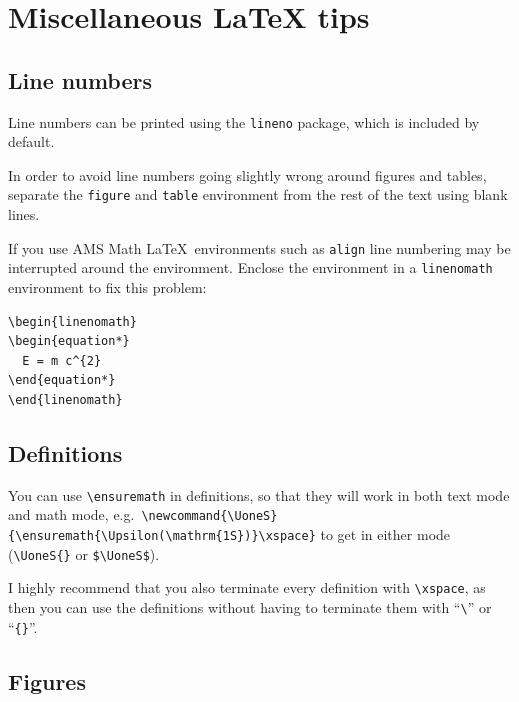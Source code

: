 \documentclass[UKenglish]{latex/atlasdoc}
\newcommand{\Macro}[1]{\texttt{\textbackslash #1}\xspace}
\newcommand{\Package}[1]{\texttt{#1}\xspace}
\begin{document}
\section{Miscellaneous \LaTeX{} tips}
\label{sec:latex}

\subsection{Line numbers}

Line numbers can be printed using the \Package{lineno} package, 
which is included by default.

In order to avoid line numbers going slightly wrong around figures and tables,
separate the \Package{figure} and \Package{table} environment from the rest of the text using blank lines.

If you use AMS Math \LaTeX\ environments such as \Package{align} line numbering may be interrupted around the environment.
Enclose the environment in a \Package{linenomath} environment to fix this problem:
\begin{verbatim}
\begin{linenomath}
\begin{equation*}
  E = m c^{2}
\end{equation*}
\end{linenomath}
\end{verbatim}


\subsection{Definitions}

You can use \verb|\ensuremath| in definitions, so that they will work
in both text mode and math mode, e.g.\
\verb|\newcommand{\UoneS}{\ensuremath{\Upsilon(\mathrm{1S})}\xspace}| to get
\UoneS{} in either mode (\verb|\UoneS{}| or \verb|$\UoneS$|).

I highly recommend that you also terminate every definition with \Macro{xspace},
as then you can use the definitions without having to terminate them with
``\verb|\|'' or ``\verb|{}|''.


\subsection{Figures}
\end{document}
